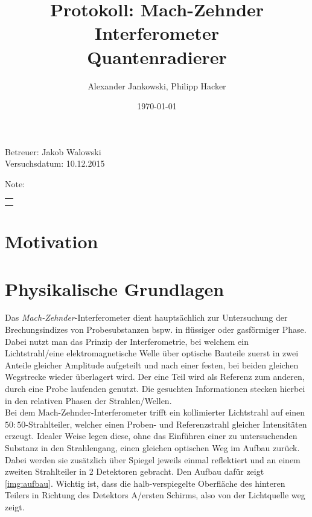 \documentclass[numbers=noenddot,a4paper,notitlepage,twoside,BCOR15mm]{scrartcl}
\title{Protokoll: Mach-Zehnder Interferometer\\Quantenradierer} %
\author{Alexander Jankowski, Philipp Hacker}
\date{\today}
\newcommand{\tilt}[1]{\textit{#1}}
\begin{document}
	\maketitle
	\begin{center}
		Betreuer: Jakob Walowski\\ %
		Versuchsdatum: 10.12.2015\\ %
		\begin{table}[h]
			\centering
			Note: %
			\begin{tabularx}{1.5cm}{|X|}
				\hline \\ \\
				\hline
			\end{tabularx}
		\end{table}
	\end{center}
	\vspace*{\fill}
	\tableofcontents
	\vfill
	\clearpage
	\section{Motivation}

	\clearpage
	\section{Physikalische Grundlagen}

		Das \tilt{Mach-Zehnder}-Interferometer dient hauptsächlich zur Untersuchung der Brechungsindizes von Probesubstanzen bspw. in flüssiger oder gasförmiger Phase. Dabei nutzt man das Prinzip der Interferometrie, bei welchem ein Lichtstrahl/eine elektromagnetische Welle über optische Bauteile zuerst in zwei Anteile gleicher Amplitude aufgeteilt und nach einer festen, bei beiden gleichen Wegstrecke wieder überlagert wird. Der eine Teil wird als Referenz zum anderen, durch eine Probe laufenden genutzt. Die gesuchten Informationen stecken hierbei in den relativen Phasen der Strahlen/Wellen.\\
		Bei dem Mach-Zehnder-Interferometer trifft ein kollimierter Lichtstrahl auf einen $50:50$-Strahlteiler, welcher einen Proben- und Referenzstrahl gleicher Intensitäten erzeugt. Idealer Weise legen diese, ohne das Einführen einer zu untersuchenden Substanz in den Strahlengang, einen gleichen optischen Weg im Aufbau zurück. Dabei werden sie zusätzlich über Spiegel jeweils einmal reflektiert und an einem zweiten Strahlteiler in 2 Detektoren gebracht. Den Aufbau dafür zeigt \autoref{img:aufbau}. Wichtig ist, dass die halb-verspiegelte Oberfläche des hinteren Teilers in Richtung des Detektors A/ersten Schirms, also von der Lichtquelle weg zeigt.
\end{document}
